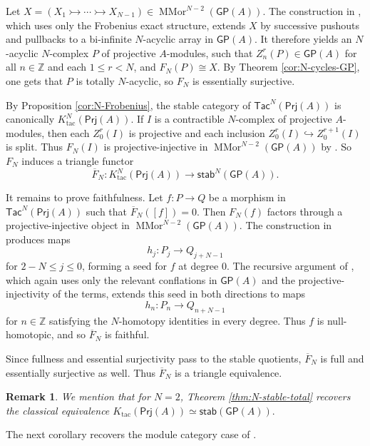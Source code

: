 \documentclass{amsart}
\theoremstyle{bfupright head,slanted body}
\theoremstyle{bfupright head,upright body}
\theoremstyle{fixed bf head,slanted body}
\theoremstyle{fixed bf head,upright body}
\newtheorem{rmk}[res]{Remark}           \newtheorem*{rmk*}{Remark}
\theoremstyle{numbered paragraph}
\newenvironment{prf*}[1][Proof]{%
	\begin{proof}[\bf #1]
		\setcounter{equation}{0}
		\renewcommand{\theequation}{\arabic{equation}}}
	{\end{proof}
}
\numberwithin{equation}{res}
\newcommand{\GP}[1]{\mathsf{GP}(#1)}
\newcommand{\Prj}[1]{\mathsf{Prj}(#1)}
\begin{document}
\begin{prf*}
Let $X=(X_1\rightarrowtail\cdots\rightarrowtail X_{N-1}) \in\operatorname{MMor}^{N-2}(\GP{A})$. The construction in
\cite[Proposition 4.5]{BM24}, which uses only the Frobenius exact structure, extends $X$ by successive pushouts and pullbacks to a bi-infinite $N$-acyclic array in $\GP{A}$. It therefore yields an $N$-acyclic $N$-complex $P$ of projective $A$-modules, such that $Z_n^r(P)\in\GP{A}$ for all $n\in\mathbb Z$ and each $1\leq r<N$, and $F_N(P)\cong X$. By Theorem \ref{cor:N-cycles-GP}, one gets that $P$ is totally $N$-acyclic, so $F_N$ is essentially surjective.

By Proposition \ref{cor:N-Frobenius}, the stable category of $\mathsf{Tac}^N(\Prj A)$ is canonically $K^N_{\mathrm{tac}}(\Prj A)$. If $I$ is a contractible $N$-complex of projective $A$-modules, then each $Z_0^r(I)$ is projective and each inclusion $Z_0^r(I)\hookrightarrow Z_0^{r+1}(I)$ is split. Thus $F_N(I)$ is projective-injective in $\operatorname{MMor}^{N-2}(\GP{A})$ by \cite[Proposition 3.9]{BM24}. So $F_N$ induces a triangle functor
$$\overline F_N: K^N_{\mathrm{tac}}(\Prj A)\to\mathsf{stab}^N(\GP{A}).$$

It remains to prove faithfulness. Let $f: P\to Q$ be a morphism in $\mathsf{Tac}^N(\Prj A)$ such that $\overline F_N([f])=0$. Then $F_N(f)$ factors through a projective-injective object in
$\operatorname{MMor}^{N-2}(\GP{A})$. The construction in \cite[Lemma 4.10]{BM24} produces maps
$$h_j: P_j\to Q_{j+N-1}$$
for $2-N\leq j\leq0$, forming a seed for $f$ at degree $0$. The recursive argument of \cite[Lemma 4.11]{BM24}, which again uses only the relevant conflations in $\GP{A}$ and the projective-injectivity of the terms, extends this seed in both directions to maps
$$h_n: P_n\to Q_{n+N-1}$$
for $n\in\mathbb Z$ satisfying the $N$-homotopy identities in every degree. Thus $f$ is null-homotopic, and so $\overline F_N$ is faithful.

Since fullness and essential surjectivity pass to the stable quotients, $\overline F_N$ is full and essentially surjective as well. Thus $\overline F_N$ is a triangle equivalence.
\end{prf*}

\begin{rmk}
We mention that for $N=2$, Theorem \ref{thm:N-stable-total} recovers the classical equivalence $K_{\mathrm{tac}}(\Prj A)\simeq\mathsf{stab}(\GP{A}).$
\end{rmk}

The next corollary recovers the module category case of
\cite[Theorem 4.12]{BM24}.
\end{document}

